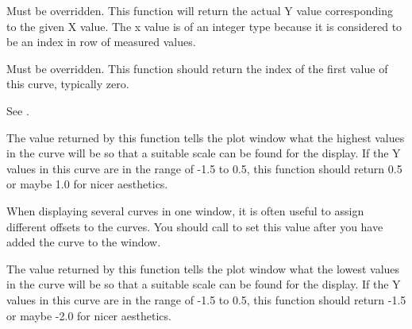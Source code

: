 Must be overridden. This function will return the actual Y value corresponding
to the given X value. The x value is of an integer type because it is considered
to be an index in row of measured values.

\label{wxplotcurvegetstartx}


Must be overridden. This function should return the index of the first value
of this curve, typically zero.

\label{wxplotcurvegetstarty}


See .

\label{wxplotcurvesetendy}


The value returned by this function tells the plot window what the highest values
in the curve will be so that a suitable scale can be found for the display. If
the Y values in this curve are in the range of -1.5 to 0.5, this function should
return 0.5 or maybe 1.0 for nicer aesthetics.

\label{wxplotcurvesetoffsety}


When displaying several curves in one window, it is often useful to assign
different offsets to the curves. You should call  
to set this value after you have added the curve to the window.

\label{wxplotcurvesetstarty}


The value returned by this function tells the plot window what the lowest values
in the curve will be so that a suitable scale can be found for the display. If
the Y values in this curve are in the range of -1.5 to 0.5, this function should
return -1.5 or maybe -2.0 for nicer aesthetics.

